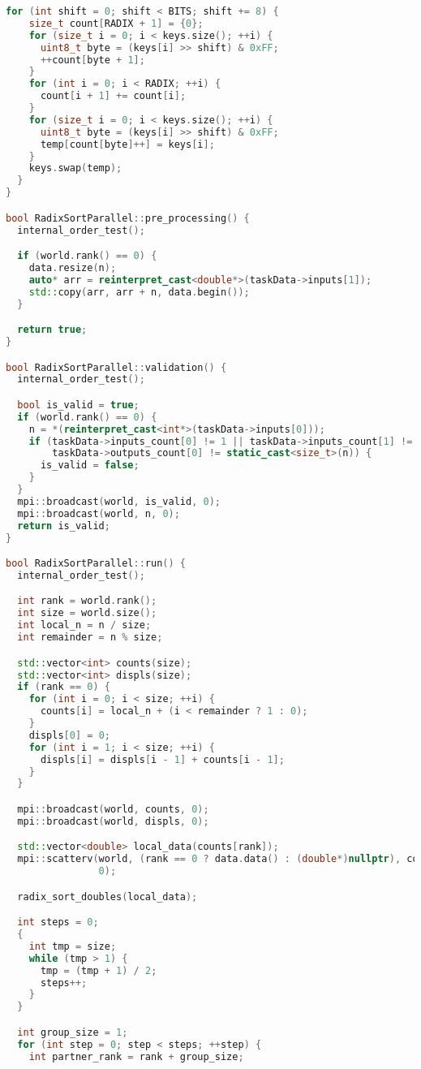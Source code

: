\documentclass[a4paper,12pt]{article}
\begin{document}
\begin{lstlisting}[language=C++, caption={Реализация параллельной поразрядной сортировки с использованием MPI}]
  for (int shift = 0; shift < BITS; shift += 8) {
    size_t count[RADIX + 1] = {0};
    for (size_t i = 0; i < keys.size(); ++i) {
      uint8_t byte = (keys[i] >> shift) & 0xFF;
      ++count[byte + 1];
    }
    for (int i = 0; i < RADIX; ++i) {
      count[i + 1] += count[i];
    }
    for (size_t i = 0; i < keys.size(); ++i) {
      uint8_t byte = (keys[i] >> shift) & 0xFF;
      temp[count[byte]++] = keys[i];
    }
    keys.swap(temp);
  }
}

bool RadixSortParallel::pre_processing() {
  internal_order_test();

  if (world.rank() == 0) {
    data.resize(n);
    auto* arr = reinterpret_cast<double*>(taskData->inputs[1]);
    std::copy(arr, arr + n, data.begin());
  }

  return true;
}

bool RadixSortParallel::validation() {
  internal_order_test();

  bool is_valid = true;
  if (world.rank() == 0) {
    n = *(reinterpret_cast<int*>(taskData->inputs[0]));
    if (taskData->inputs_count[0] != 1 || taskData->inputs_count[1] != static_cast<size_t>(n) ||
        taskData->outputs_count[0] != static_cast<size_t>(n)) {
      is_valid = false;
    }
  }
  mpi::broadcast(world, is_valid, 0);
  mpi::broadcast(world, n, 0);
  return is_valid;
}

bool RadixSortParallel::run() {
  internal_order_test();

  int rank = world.rank();
  int size = world.size();
  int local_n = n / size;
  int remainder = n % size;

  std::vector<int> counts(size);
  std::vector<int> displs(size);
  if (rank == 0) {
    for (int i = 0; i < size; ++i) {
      counts[i] = local_n + (i < remainder ? 1 : 0);
    }
    displs[0] = 0;
    for (int i = 1; i < size; ++i) {
      displs[i] = displs[i - 1] + counts[i - 1];
    }
  }

  mpi::broadcast(world, counts, 0);
  mpi::broadcast(world, displs, 0);

  std::vector<double> local_data(counts[rank]);
  mpi::scatterv(world, (rank == 0 ? data.data() : (double*)nullptr), counts, displs, local_data.data(), counts[rank],
                0);

  radix_sort_doubles(local_data);

  int steps = 0;
  {
    int tmp = size;
    while (tmp > 1) {
      tmp = (tmp + 1) / 2;
      steps++;
    }
  }

  int group_size = 1; 
  for (int step = 0; step < steps; ++step) {
    int partner_rank = rank + group_size;


\end{lstlisting}
\end{document}
